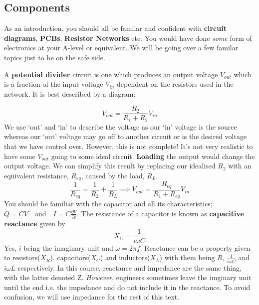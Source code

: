 \subsection{Components}
As an introduction, you should all be familar and confident with \textbf{circuit diagrams}, \textbf{PCBs}, \textbf{Resistor Networks} etc. You would have done \textit{some} form of electronics at your A-level or equivalent. We will be going over a few familar topics just to be on the safe side.
\par
A \textbf{potential divider} circuit is one which produces an output voltage $V_{out}$ which is a fraction of the input voltage $V_{in}$ dependent on the resistors used in the network. It is best described by a diagram:
\par
\begin{equation}
V_{out} = \frac{R_{2}}{R_{1} + R_{2}}V_{in}
\end{equation}
We use `out' and `in' to describe the voltage as our `in' voltage is the source whereas our `out' voltage may go off to another circuit or is the desired voltage that we have control over. However, this is not complete! It's not very realistic to have some $V_{out}$ going to some ideal circuit. \textbf{Loading} the output would change the output voltage. We can simplify this result by replacing our idealised $R_{2}$ with an equivalent resistance, $R_{eq}$, caused by the load, $R_{L}$.
\begin{equation}
\frac{1}{R_{eq}} = \frac{1}{R_{2}} + \frac{1}{R_{L}} \implies V_{out} = \frac{R_{eq}}{R_{1} + R_{eq}}V_{in}
\end{equation}
You should be familiar with the capacitor and all its characteristics; \begin{math} Q=CV \quad \textrm{and} \quad I = C\frac{\partial V}{\partial t}\end{math}. The resistance of a capacitor is known as \textbf{capacitive reactance} given by
\begin{equation}
X_{C} = \frac{1}{i\omega C}
\end{equation}
Yes, $i$ being the imaginary unit and $\omega = 2\pi f$. Reactance can be a property given to resistors($X_{R}$), capacitors($X_{C}$) and inductors($X_{L}$) with them being $R$, $\frac{1}{i\omega C}$ and $i\omega L$ respectively. In this course, reactance and impedance are the same thing, with the latter denoted Z. \textit{However}, engineers sometimes leave the imginary unit until the end i.e. the impedance and do not include it in the reactance. To avoid confusion, we will use impedance for the rest of this text. %
